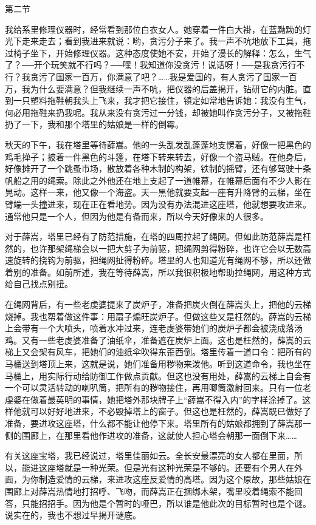 第二节 

我给系里修理仪器时，经常看到那位白衣女人。她穿着一件白大褂，在蓝黝黝的灯光下走来走去；看到我进来就说：哟，贪污分子来了。我一声不吭地放下工具，拖过椅子坐下，开始修理仪器。这种态度使她不安，开始了漫长的解释：怎么，生气了？──开个玩笑就不行吗？──嘿！我知道你没贪污！说话呀！──是我贪污行不行？我贪污了国家一百万，你满意了吧？……我是爱国的，有人贪污了国家一百万，我为什么要满意？但我继续一声不吭，把仪器的后盖揭开，钻研它的内脏。直到一只塑料拖鞋朝我头上飞来，我才把它接住，镇定如常地告诉她：我没有生气，何必用拖鞋来扔我呢。我从来没有贪污过一分钱，却被她叫作贪污分子，又被拖鞋扔了一下，我和那个塔里的姑娘是一样的倒霉。 

秋天的下午，我在塔里等待薛嵩。他的一头乱发乱蓬蓬地支愣着，好像一把黑色的鸡毛掸子；披着一件黑色的斗篷，在塔下转来转去，好像一个盗马贼。在他身后，好像摊开了一个跳蚤市场，散放着各种木制的构架，铁制的摇臂，还有够驾驶十条帆船之用的绳索。除此之外他还在地上支起了一道帷幕，在帷幕后面有不少人影在晃动。这样一来，他又像一个海盗。天一黑他就要支起一座有升降臂的云梯，坐在臂端一头撞进来，现在正在看地势。因为没有办法混进这座塔，他就想要攻进来。通常他只是一个人，但因为他是有备而来，所以今天好像来的人很多。 

对于薛嵩，塔里已经有了防范措施，在塔的四周拉起了绳网。但如此防范薛嵩是枉然的，也许那架绳梯会以一把大剪子为前驱，把绳网剪得粉碎，也许它会以无数高速旋转的挠钩为前驱，把绳网扯得粉碎。塔里的人也知道光有绳网不够，所以还做着别的准备。如前所述，我在等待薛嵩，所以我很积极地帮助拉绳网，用这种方式给自己找点别扭。 

在绳网背后，有一些老虔婆提来了炭炉子，准备把炭火倒在薛嵩头上，把他的云梯烧掉。我也帮着做这件事：用扇子煽旺炭炉子。但做这些又是枉然的。薛嵩的云梯上会带有一个大喷头，喷着水冲过来，连老虔婆带她们的炭炉子都会被浇成落汤鸡。又有一些老虔婆准备了油纸伞，准备遮在炭炉上面。这也是枉然的，薛嵩的云梯上又会架有风车，把她们的油纸伞吹得东歪西倒。塔里传着一道口令：把所有的马桶送到塔顶上来，这就是说，她们准备用秽物来泼他。听到这道命令，我也坐在马桶上，用实际行动给防御工作做点贡献。但这也没有用处，薛嵩的云梯上自会有一个可以灵活转动的喇叭筒，把所有的秽物接住，再用唧筒激射回来。只有一位老虔婆在做着最英明的事情，她把塔外那块牌子上“薛嵩不得入内”的字样涂掉了。这样他就可以好好地进来，不必毁掉塔上的窗子。但这也是枉然的，薛嵩既已做好了准备，要进攻这座塔，什么都不能让他停下来。塔里所有的姑娘都拥到了薛嵩那一侧的围廊上，在那里看他作进攻的准备，这就使人担心塔会朝那一面倒下来…… 

有关这座宝塔，我已经说过，塔里佳丽如云。全长安最漂亮的女人都在里面，所以，能进这座塔就是一种光荣。但是光有这种光荣是不够的。还要有个男人在外面，为你制造爱情的云梯，来进攻这座反爱情的高塔。因为这个原故，那些姑娘在围廊上对薛嵩热情地打招呼、飞吻，而薛嵩正在捆绑木架，嘴里咬着绳索不能回答，只能招招手。因为他是个暂时的哑巴，所以谁是他此次的目标暂时也是个谜。说实在的，我也不想过早揭开谜底。 

